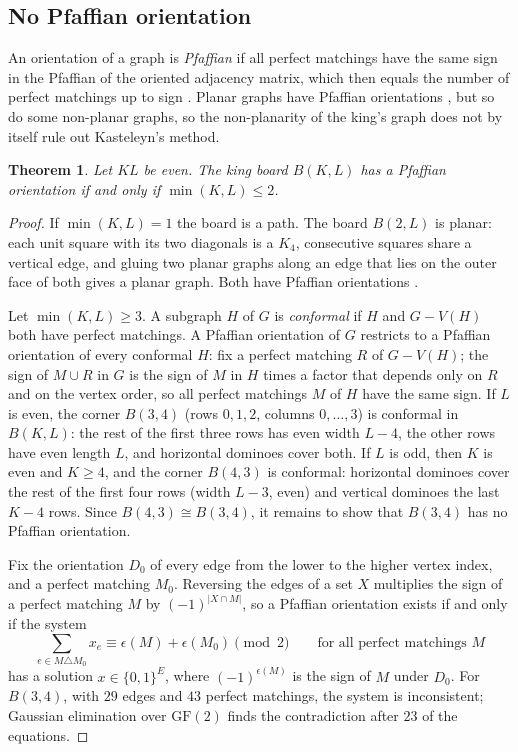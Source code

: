 \documentclass[11pt]{amsart}
\newtheorem{theorem}{Theorem}[section]
\theoremstyle{definition}
\theoremstyle{remark}
\begin{document}
\subsection{No Pfaffian orientation}
An orientation of a graph is \emph{Pfaffian} if all perfect matchings have the same sign in the
Pfaffian of the oriented adjacency matrix, which then equals the number of perfect matchings up to
sign \cite[Ch.~8]{lovaszplummer1986}. Planar graphs have Pfaffian orientations
\cite{kasteleyn1961}, but so do some non-planar graphs, so the non-planarity of the king's graph
does not by itself rule out Kasteleyn's method.

\begin{theorem}\label{thm:pfaff}
Let $KL$ be even. The king board $B(K, L)$ has a Pfaffian orientation if and only if
$\min(K, L) \le 2$.
\end{theorem}
\begin{proof}
If $\min(K, L) = 1$ the board is a path. The board $B(2, L)$ is planar: each unit square with
its two diagonals is a $K_4$, consecutive squares share a vertical edge, and gluing two planar
graphs along an edge that lies on the outer face of both gives a planar graph. Both have
Pfaffian orientations \cite{kasteleyn1961}.

Let $\min(K, L) \ge 3$. A subgraph $H$ of $G$ is \emph{conformal} if $H$ and $G - V(H)$ both have
perfect matchings. A Pfaffian orientation of $G$ restricts to a Pfaffian orientation of every
conformal $H$: fix a perfect matching $R$ of $G - V(H)$; the sign of $M \cup R$ in $G$ is the sign
of $M$ in $H$ times a factor that depends only on $R$ and on the vertex order, so all perfect
matchings $M$ of $H$ have the same sign. If $L$ is even, the corner $B(3, 4)$ (rows $0, 1, 2$,
columns $0, \dots, 3$) is conformal in $B(K, L)$: the rest of the first three rows has even width
$L - 4$, the other rows have even length $L$, and horizontal dominoes cover both. If $L$ is odd,
then $K$ is even and $K \ge 4$, and the corner $B(4, 3)$ is conformal: horizontal dominoes cover
the rest of the first four rows (width $L - 3$, even) and vertical dominoes the last $K - 4$
rows. Since $B(4, 3) \cong B(3, 4)$, it remains to show that $B(3, 4)$ has no Pfaffian
orientation.

Fix the orientation $D_0$ of every edge from the lower to the higher vertex index, and a perfect
matching $M_0$. Reversing the edges of a set $X$ multiplies the sign of a perfect matching $M$ by
$(-1)^{|X \cap M|}$, so a Pfaffian orientation exists if and only if the system
\[
  \sum_{e \in M \triangle M_0} x_e \equiv \epsilon(M) + \epsilon(M_0) \pmod 2
  \qquad \text{for all perfect matchings } M
\]
has a solution $x \in \{0, 1\}^E$, where $(-1)^{\epsilon(M)}$ is the sign of $M$ under $D_0$. For
$B(3, 4)$, with $29$ edges and $43$ perfect matchings, the system is inconsistent; Gaussian
elimination over $\mathrm{GF}(2)$ finds the contradiction after $23$ of the equations.
\end{proof}
\end{document}
